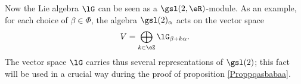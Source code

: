Now the Lie algebra \( \lG\) can be seen as a \( \gsl(2,\eR)\)-module. As an example, for each choice of \( \beta\in\Phi\), the algebra \( \gsl(2)_{\alpha}\) acts on the vector space
\begin{equation}
    V=\bigoplus_{k\in\eZ}\lG_{\beta+k\alpha}.
\end{equation}
The vector space \( \lG\) carries thus several representations of \( \gsl(2)\); this fact will be used in a crucial way during the proof of proposition \ref{Proppqasbabaa}.

